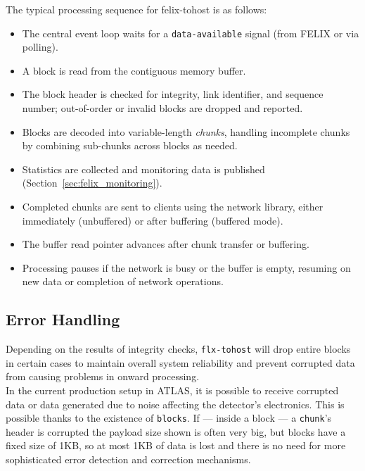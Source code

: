 The typical processing sequence for felix-tohost is as follows:
\begin{itemize}
    \item The central event loop waits for a \texttt{data-available} signal (from \acs{FELIX} or via polling).
    \item A block is read from the contiguous memory buffer.
    \item The block header is checked for integrity, link identifier, and sequence number; out-of-order or invalid blocks are dropped and reported.
    \item Blocks are decoded into variable-length \emph{chunks}, handling incomplete chunks by combining sub-chunks across blocks as needed.
    \item Statistics are collected and monitoring data is published (Section~\ref{sec:felix_monitoring}).
    \item Completed chunks are sent to clients using the network library, either immediately (unbuffered) or after buffering (buffered mode).
    \item The buffer read pointer advances after chunk transfer or buffering.
    \item Processing pauses if the network is busy or the buffer is empty, resuming on new data or completion of network operations.
\end{itemize}

\subsection{Error Handling}
\label{sec:felix_tohost_error_handling}

Depending on the results of integrity checks, \texttt{flx-tohost} will drop entire blocks in certain cases to maintain overall system reliability and prevent corrupted data from causing problems in onward processing.\\
In the current production setup in \acs{ATLAS}, it is possible to receive corrupted data or data generated due to noise affecting the detector's electronics.
This is possible thanks to the existence of \texttt{blocks}. If --- inside a block --- a \texttt{chunk}'s header is corrupted the payload size shown is often very big, but blocks have a fixed size of 1KB, so at most 1KB of data is lost and there is no need for more sophisticated error detection and correction mechanisms.

